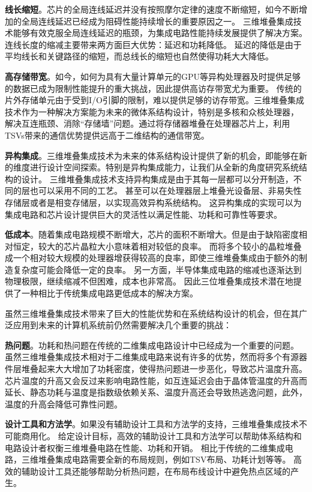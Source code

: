 \textbf{线长缩短}。芯片的全局连线延迟并没有按照摩尔定律的速度不断缩短，如今不断增加的全局连线延迟已经成为阻碍性能持续增长的重要原因之一。
三维堆叠集成技术能够有效克服全局连线延迟的瓶颈，为集成电路性能持续发展提供了解决方案。连线长度的缩减主要带来两方面巨大优势：延迟和功耗降低。
延迟的降低是由于平均线长和关键路径的缩短，而总线长的缩短也自然使得功耗大大降低。

\textbf{高存储带宽}。如今，如何为具有大量计算单元的GPU等异构处理器及时提供足够的数据已成为限制性能提升的重大挑战，因此提供高访存带宽尤为重要。
传统的片外存储单元由于受到I/O引脚的限制，难以提供足够的访存带宽。三维堆叠集成技术作为一种解决方案能为未来的微体系结构设计，特别是多核和众核处理器，
解决互连瓶颈、消除“存储墙”问题。通过将存储器堆叠在处理器芯片上，利用TSVs带来的通信优势提供远高于二维结构的通信带宽。

\textbf{异构集成}。三维堆叠集成技术为未来的体系结构设计提供了新的机会，即能够在新的维度进行设计空间探索。特别是异构集成能力，让我们从全新的角度研究系统结构的设计。
三维堆叠集成技术支持异构集成是由于其每一层都可以分开制造，不同的层也可以采用不同的工艺。
甚至可以在处理器层上堆叠光设备层、非易失性存储层或者是相变存储层，以实现高效异构系统结构。
这异构集成的实现可以为集成电路和芯片设计提供巨大的灵活性以满足性能、功耗和可靠性等要求。

\textbf{低成本}。随着集成电路规模不断增大，芯片的面积不断增大。但是由于缺陷密度相对恒定，较大的芯片晶粒大小意味着相对较低的良率。
而将多个较小的晶粒堆叠成一个相对较大规模的处理器增获得较高的良率，即使三维堆叠集成由于额外的制造复杂度可能会降低一定的良率。
另一方面，半导体集成电路的缩减也逐渐达到物理极限，继续缩减不但困难，成本也非常高。
因此三位堆叠集成技术潜在地提供了一种相比于传统集成电路更低成本的解决方案。


虽然三维堆叠集成技术带来了巨大的性能优势和在系统结构设计的机会，但在其广泛应用到未来的计算机系统前仍然需要解决几个重要的挑战：

\textbf{热问题}。功耗和热问题在传统的二维集成电路设计中已经成为一个重要的问题。
虽然三维堆叠集成技术相对于二维集成电路来说有许多的优势，然而将多个有源器件层堆叠起来大大增加了功耗密度，使得热问题进一步恶化，导致芯片温度升高。
芯片温度的升高又会反过来影响电路性能，如互连延迟会由于晶体管温度的升高而延长、静态功耗与温度是指数级依赖关系、温度升高还会导致热逃逸问题，此外，温度的升高会降低可靠性问题。

\textbf{设计工具和方法学}。如果没有辅助设计工具和方法学的支持，三维堆叠集成技术不可能商用化。
给定设计目标，高效的辅助设计工具和方法学可以帮助体系结构和电路设计者权衡三维堆叠电路在性能、功耗和开销。
相比于传统的二维集成电路，三维堆叠集成电路需要全新的布局规则，例如TSV布局、功耗计划等等。
高效的辅助设计工具还能够帮助分析热问题，在布局布线设计中避免热点区域的产生。

